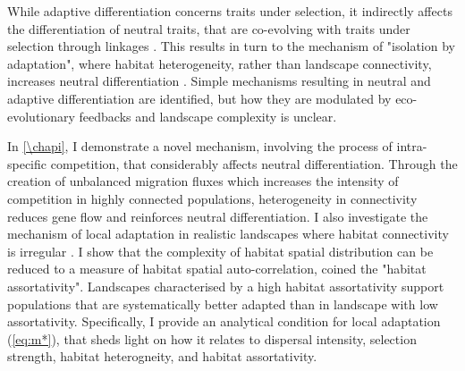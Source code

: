 % 
% 
While adaptive differentiation concerns traits under selection, it indirectly affects the differentiation of neutral traits, that are co-evolving with traits under selection through linkages \citep{Billiard2015,Lepers2021}. This results in turn to the mechanism of "isolation by adaptation", where habitat heterogeneity, rather than landscape connectivity, increases neutral differentiation \citep{nosil2008}. 
% 
Simple mechanisms resulting in neutral and adaptive differentiation are identified, but how they are modulated by eco-evolutionary feedbacks and landscape complexity is unclear. %

In \cref{\chapi}, I demonstrate a novel mechanism, involving the process of intra-specific competition, that considerably affects neutral differentiation. Through the creation of unbalanced migration fluxes which increases the intensity of competition in highly connected populations, heterogeneity in connectivity reduces gene flow and reinforces neutral differentiation. %
% 
I also investigate the mechanism of local adaptation in realistic landscapes where habitat connectivity is irregular \citep{Dale2010,LiebermanHauert2005}. I show that the complexity of habitat spatial distribution can be reduced to a measure of habitat spatial auto-correlation, coined the "habitat assortativity". Landscapes characterised by a high habitat assortativity support populations that are systematically better adapted than in landscape with low assortativity. Specifically, I provide an analytical condition for local adaptation  (\cref{eq:m*}), that sheds light on how it relates to dispersal intensity, selection strength, habitat heterogneity, and habitat assortativity.

